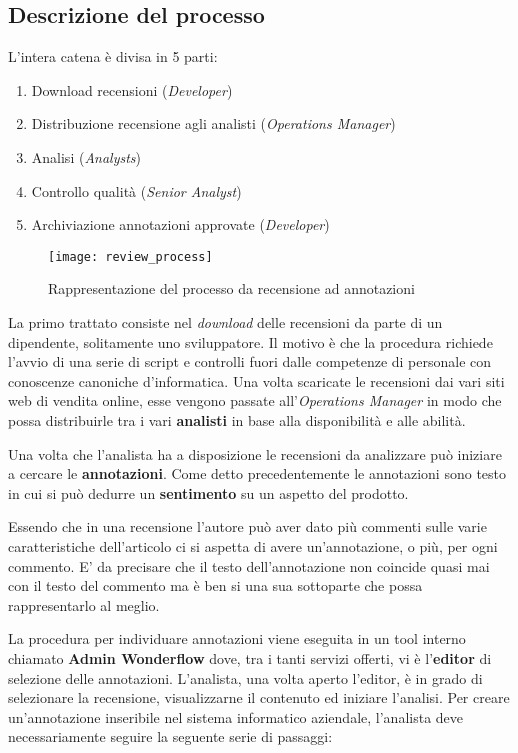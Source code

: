 \subsection{Descrizione del processo}
\label{subsec:processo_recensioni_annotazioni}
L'intera catena è divisa in 5 parti:
\begin{enumerate}
  \item Download recensioni (\textit{Developer})
  \item Distribuzione recensione agli analisti (\textit{Operations Manager})
  \item Analisi (\textit{Analysts})
  \item Controllo qualità (\textit{Senior Analyst})
  \item Archiviazione annotazioni approvate (\textit{Developer})
\end{enumerate}

\begin{figure}[ht]
\begin{center}
\texttt{[image: review\_process]}
\caption{Rappresentazione del processo da recensione ad annotazioni}
\label{fig:review_process}
\end{center}
\end{figure}

La primo trattato consiste nel \textit{download} delle recensioni da parte di
un dipendente, solitamente uno sviluppatore. Il motivo è che la procedura
richiede l'avvio di una serie di \gls{script} e controlli fuori dalle
competenze di personale con conoscenze canoniche d'informatica.
Una volta scaricate le recensioni dai vari siti web di vendita online, esse
vengono passate all'\textit{Operations Manager} in modo che possa distribuirle
tra i vari \textbf{analisti} in base alla disponibilità e alle abilità.

Una volta che l'analista ha a disposizione le recensioni da analizzare può
iniziare a cercare le \textbf{annotazioni}. Come detto precedentemente le
annotazioni sono testo in cui si può dedurre un \textbf{sentimento} su un
aspetto del prodotto.

Essendo che in una recensione l'autore può aver dato più commenti sulle varie
caratteristiche dell'articolo ci si aspetta di avere un'annotazione, o più, per
ogni commento. E' da precisare che il testo dell'annotazione non coincide quasi
mai con il testo del commento ma è ben si una sua sottoparte che possa
rappresentarlo al meglio.

La procedura per individuare annotazioni viene eseguita in un tool interno
chiamato \textbf{Admin Wonderflow} dove, tra i tanti servizi offerti, vi è
l'\textbf{editor} di selezione delle annotazioni. L'analista, una volta aperto
l'editor, è in grado di selezionare la recensione, visualizzarne il contenuto ed
iniziare l'analisi. Per creare un'annotazione inseribile nel sistema
informatico aziendale, l'analista deve necessariamente seguire la seguente
serie di passaggi:

